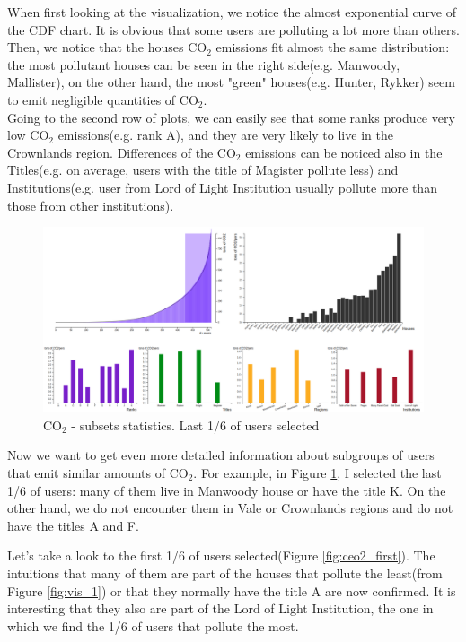 \documentclass{article}
\begin{document}
When first looking at the visualization, we notice the almost exponential curve of the CDF chart. It is obvious that some users are polluting a lot more than others. Then, we notice that the houses CO$_2$ emissions fit almost the same distribution: the most pollutant houses can be seen in the right side(e.g. Manwoody, Mallister), on the other hand, the most "green" houses(e.g. Hunter, Rykker) seem to emit negligible quantities of CO$_2$. \\
Going to the second row of plots, we can easily see that some ranks produce very low CO$_2$ emissions(e.g. rank A), and they are very likely to live in the Crownlands region. Differences of the CO$_2$ emissions can be noticed also in the Titles(e.g. on average, users with the title of Magister pollute less) and Institutions(e.g. user from Lord of Light Institution usually pollute more than those from other institutions).


\begin{figure}[H]
	\centering
	\includegraphics[scale=0.28]{img/ceo2_last.png}
	\caption{CO${_2}$ - subsets statistics. Last 1/6 of users selected}
	\label{fig:ceo2_last}
\end{figure}
Now we want to get even more detailed information about subgroups of users that emit similar amounts of CO$_2$. For example, in Figure \ref{fig:ceo2_last}, I selected the last 1/6 of users: many of them live in Manwoody house or have the title K. On the other hand, we do not encounter them in Vale or Crownlands regions and do not have the titles A and F. 

Let's take a look to the first 1/6 of users selected(Figure \ref{fig:ceo2_first}). The intuitions that many of them are part of the houses that pollute the least(from Figure \ref{fig:vis_1}) or that they normally have the title A are now confirmed. It is interesting that they also are part of the Lord of Light Institution, the one in which we find the 1/6 of users that pollute the most.
\end{document}
